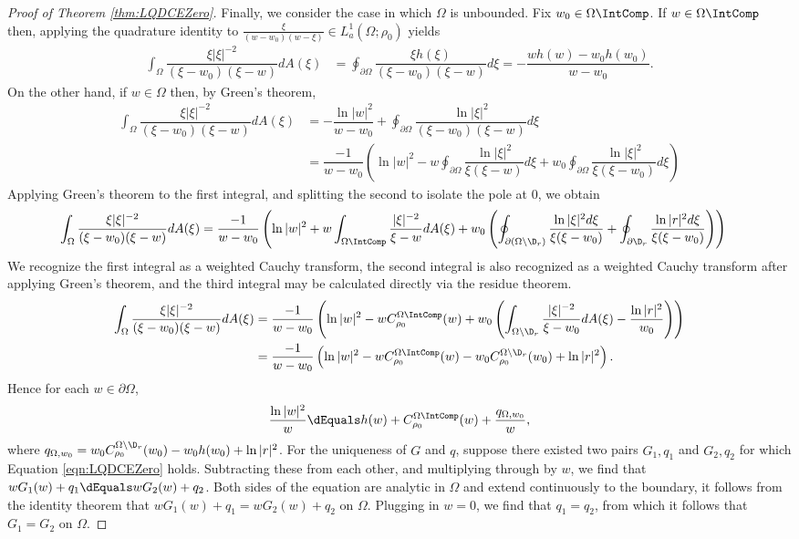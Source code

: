 \documentclass{article}
\numberwithin{equation}{section}
\begin{document}
\begin{proof}[Proof of Theorem \ref{thm:LQDCEZero}]
Finally, we consider the case in which $\Omega$ is unbounded. Fix $w_0\in\Omega\IntComp$. If $w\in\Omega\IntComp$ then, applying the quadrature identity to $\frac{\xi}{(w-w_0)(w-\xi)}\in L_a^1(\Omega;\rho_0)$ yields
\begin{align*}
    \int_{\Omega}\dfrac{\xi|\xi|^{-2}}{(\xi-w_0)(\xi-w)}dA(\xi)&=\oint_{\partial\Omega}\dfrac{\xi h(\xi)}{(\xi-w_0)(\xi-w)}d\xi=-\dfrac{wh(w)-w_0h(w_0)}{w-w_0}.
\end{align*}
On the other hand, if $w\in\Omega$ then, by Green's theorem,
\begin{align*}
    \int_{\Omega}\dfrac{\xi|\xi|^{-2}}{(\xi-w_0)(\xi-w)}dA(\xi)&=-\dfrac{\ln|w|^2}{w-w_0}+\oint_{\partial\Omega}\dfrac{\ln|\xi|^2}{(\xi-w_0)(\xi-w)}d\xi\\
    &=\dfrac{-1}{w-w_0}\left(\ln|w|^2-w\oint_{\partial\Omega}\dfrac{\ln|\xi|^2}{\xi(\xi-w)}d\xi+w_0\oint_{\partial\Omega}\dfrac{\ln|\xi|^2}{\xi(\xi-w_0)}d\xi\right)
\end{align*}
Applying Green's theorem to the first integral, and splitting the second to isolate the pole at $0$, we obtain
\begin{align*}
    \int_{\Omega}\dfrac{\xi|\xi|^{-2}}{(\xi-w_0)(\xi-w)}dA(\xi)&=\dfrac{-1}{w-w_0}\left(\ln|w|^2+w\int_{\Omega\IntComp}\dfrac{|\xi|^{-2}}{\xi-w}dA(\xi)+w_0\left(\oint_{\partial(\Omega\setminus\D_r)}\dfrac{\ln|\xi|^2d\xi}{\xi(\xi-w_0)}+\oint_{\partial\D_r}\dfrac{\ln|r|^2d\xi}{\xi(\xi-w_0)}\right)\right)
\end{align*}
We recognize the first integral as a weighted Cauchy transform, the second integral is also recognized as a weighted Cauchy transform after applying Green's theorem, and the third integral may be calculated directly via the residue theorem.
\begin{align*}
    \int_{\Omega}\dfrac{\xi|\xi|^{-2}}{(\xi-w_0)(\xi-w)}dA(\xi)&=\dfrac{-1}{w-w_0}\left(\ln|w|^2-wC_{\rho_0}^{\Omega\IntComp}(w)+w_0\left(\int_{\Omega\setminus\D_r}\dfrac{|\xi|^{-2}}{\xi-w_0}dA(\xi)-\dfrac{\ln|r|^2}{w_0}\right)\right)\\
    &=\dfrac{-1}{w-w_0}\left(\ln|w|^2-wC_{\rho_0}^{\Omega\IntComp}(w)-w_0C_{\rho_0}^{\Omega\setminus\D_r}(w_0)+\ln|r|^2\right).
\end{align*}
Hence for each $w\in\partial\Omega$,
$$\dfrac{\ln|w|^2}{w}\dEquals h(w)+C_{\rho_0}^{\Omega\IntComp}(w)+\dfrac{q_{\Omega,w_0}}{w},$$
where $q_{\Omega,w_0}=w_0C_{\rho_0}^{\Omega\setminus\D_r}(w_0)-w_0h(w_0)+\ln|r|^2$. For the uniqueness of $G$ and $q$, suppose there existed two pairs $G_1,q_1$ and $G_2,q_2$ for which Equation \ref{eqn:LQDCEZero} holds. Subtracting these from each other, and multiplying through by $w$, we find that $wG_1(w)+q_1\dEquals wG_2(w)+q_2$. Both sides of the equation are analytic in $\Omega$ and extend continuously to the boundary, it follows from the identity theorem that $wG_1(w)+q_1=wG_2(w)+q_2$ on $\Omega$. Plugging in $w=0$, we find that $q_1=q_2$, from which it follows that $G_1=G_2$ on $\Omega$.
\end{proof}
\end{document}
